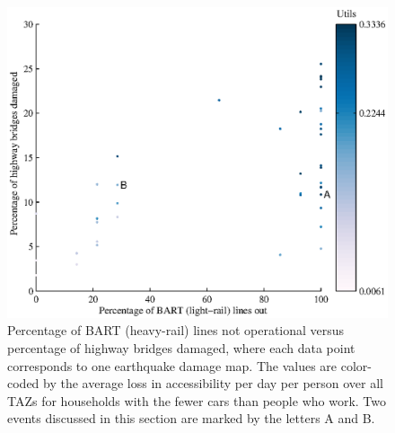 





\begin{figure}[h]
\centering
\includegraphics[width=6in]{FIGS/equity_bart_bridges_acc.eps} 
\caption{Percentage of BART (heavy-rail) lines not operational versus percentage of highway bridges damaged, where each data point corresponds to one earthquake damage map. The values are color-coded by the average loss in accessibility per day per person over all TAZs for households with the fewer cars than people who work. Two events discussed in this section are marked by the letters A and B.}
\label{fig:bartBri}
\end{figure}



